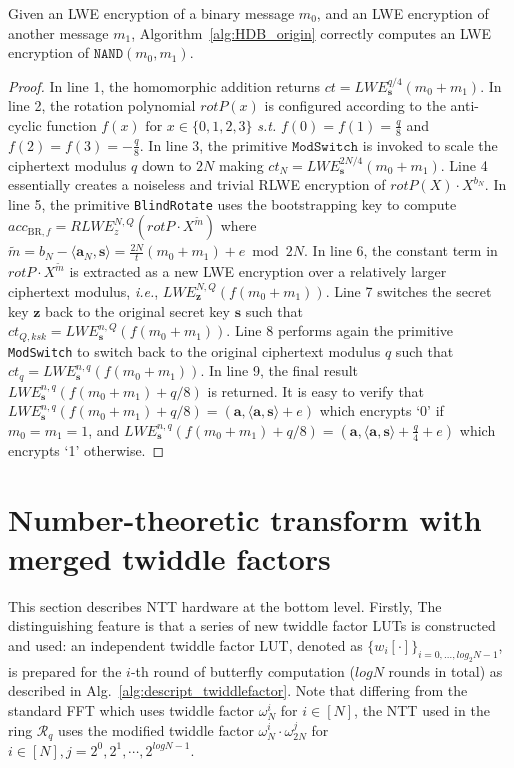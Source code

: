 \documentclass{iacrtrans}
\theoremstyle{plain}
\begin{document}
\begin{proposition}
Given an LWE encryption of a binary message $m_0$, and an LWE encryption of another message $m_1$, Algorithm~\ref{alg:HDB_origin} correctly computes an LWE encryption of $\texttt{NAND}(m_0,m_1)$.
\end{proposition}
\begin{proof}
In line 1, the homomorphic addition returns $ct=LWE_{\mathbf{s}}^{q/4}(m_0+m_1)$. In line 2, the rotation polynomial $rotP(x)$ is configured according to the anti-cyclic function $f(x)\text{ for } x\in \{0,1,2,3\}$ \textit{s.t.} $f(0)=f(1)=\frac{q}{8}$ and $f(2)=f(3)=-\frac{q}{8}$. In line 3, the primitive $\texttt{ModSwitch}$ is invoked to scale the ciphertext modulus $q$ down to $2N$ making $ct_N=LWE_{\mathbf{s}}^{2N/4}(m_0+m_1)$. Line 4 essentially creates a noiseless and trivial RLWE encryption of $rotP(X)\cdot X^{b_N}$.
In line 5, the primitive \texttt{BlindRotate} uses the bootstrapping key to compute $acc_{\text{BR},f}=RLWE_{z}^{N,Q}(rotP\cdot X^{\widetilde{m}})$ where $\widetilde{m}=b_N-\langle\mathbf{a}_N,\mathbf{s}\rangle=\frac{2N}{t}(m_0+m_1)+e \bmod 2N$. In line 6, the constant term in $rotP\cdot X^{\widetilde{m}}$ is extracted as a new LWE encryption over a relatively larger ciphertext modulus, \textit{i.e.}, $LWE_{\mathbf{z}}^{N,Q}(f(m_0+m_1))$. Line 7 switches the secret key $\mathbf{z}$ back to the original secret key $\mathbf{s}$ such that $ct_{Q,ksk}=LWE_{\mathbf{s}}^{n,Q}(f(m_0+m_1))$. Line 8 performs again the primitive \texttt{ModSwitch} to switch back to the original ciphertext modulus $q$ such that $ct_q=LWE_{\mathbf{s}}^{n,q}(f(m_0+m_1))$. In line 9, the final result $LWE_{\mathbf{s}}^{n,q}(f(m_0+m_1)+q/8)$ is returned. It is easy to verify that $LWE_{\mathbf{s}}^{n,q}(f(m_0+m_1)+q/8)=(\mathbf{a},\langle \mathbf{a}, \mathbf{s}\rangle +e)$ which encrypts `0' if $m_0=m_1=1$, and $LWE_{\mathbf{s}}^{n,q}(f(m_0+m_1)+q/8)=(\mathbf{a},\langle \mathbf{a}, \mathbf{s}\rangle +\frac{q}{4}+e)$ which encrypts `1' otherwise.
\end{proof}



\section{Number-theoretic transform with merged twiddle factors}
This section describes NTT hardware at the bottom level. Firstly,  The distinguishing feature is that a series of new twiddle factor LUTs  is constructed and used:  an independent twiddle factor LUT, denoted as $\{w_i[\cdot]\}_{i=0,\ldots,log_2N-1}$, is prepared for the $i$-th round of butterfly computation ($logN$ rounds in total) as described in Alg.~\ref{alg:descript_twiddlefactor}. Note that differing from the standard FFT which uses twiddle factor $\omega_{N}^i$ for $i\in [N]$, the NTT used in the ring $\mathcal{R}_q$ uses the modified twiddle factor $\omega_N^i\cdot\omega_{2N}^j$ for $i\in [N], j=2^0,2^1,\cdots,2^{logN-1}$. 
\end{document}
